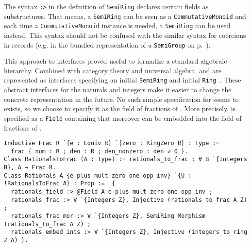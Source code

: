 \documentclass[a4paper,10pt,runningheads]{llncs}
\begin{document}
The syntax \lstinline|:>| in the definition of \lstinline|SemiRing| declares certain fields as substructures. That means, a \lstinline|SemiRing| can be seen as a \lstinline|CommutativeMonoid| and each time a \lstinline|CommutativeMonoid| instance is needed, a \lstinline|SemiRing| can be used instead. This syntax should not be confused with the similar syntax for coercions in records (e.g. in the bundled representation of a \lstinline|SemiGroup| on p.~\pageref{lstlisting:semigroup_bundled}).

This approach to interfaces proved useful to formalize a standard algebraic hierarchy. Combined with category theory and universal algebra,  and  are represented as interfaces specifying an initial \lstinline|SemiRing| and initial \lstinline|Ring|~\cite{math-classes}. These abstract interfaces for the naturals and integers make it easier to change the concrete representation in the future.
No such simple specification for  seems to exists, so we choose to specify it as the field of fractions of \Z. More precisely,  is specified as a \lstinline|Field| containing  that moreover can be embedded into the field of fractions of .
\begin{lstlisting}
Inductive Frac R `{e : Equiv R} `{zero : RingZero R} : Type := 
  frac { num : R ; den : R ; den_nonzero : den ≠ 0 }.
Class RationalsToFrac (A : Type) := rationals_to_frac : ∀ B `{Integers B}, A → Frac B.
Class Rationals A {e plus mult zero one opp inv} `{U : !RationalsToFrac A} : Prop :=  { 
  rationals_field :> @Field A e plus mult zero one opp inv ; 
  rationals_frac :> ∀ `{Integers Z}, Injective (rationals_to_frac A Z) ; 
  rationals_frac_mor :> ∀ `{Integers Z}, SemiRing_Morphism (rationals_to_frac A Z) ; 
  rationals_embed_ints :> ∀ `{Integers Z}, Injective (integers_to_ring Z A) }.
\end{lstlisting}
\vspace*{-3mm}
\end{document}
